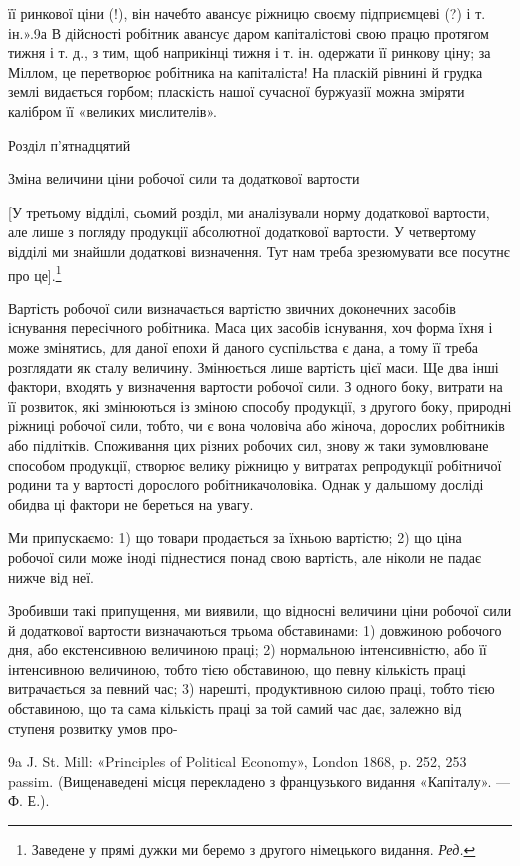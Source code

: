 її ринкової ціни (!), він начебто авансує ріжницю своєму підприємцеві
(?) і т. ін.».9а В дійсності робітник авансує даром
капіталістові свою працю протягом тижня і т. д., з тим, щоб
наприкінці тижня і т. ін. одержати її ринкову ціну; за Міллом,
це перетворює робітника на капіталіста! На пласкій рівнині
й грудка землі видається горбом; пласкість нашої сучасної буржуазії
можна зміряти калібром її «великих мислителів».

Розділ п’ятнадцятий

Зміна величини ціни робочої сили та додаткової
вартости

[У третьому відділі, сьомий розділ, ми аналізували норму
додаткової вартости, але лише з погляду продукції абсолютної
додаткової вартости. У четвертому відділі ми знайшли додаткові
визначення. Тут нам треба зрезюмувати все посутнє про це].\footnote*{
Заведене у прямі дужки ми беремо з другого німецького видання.
\emph{Ред.}
}

Вартість робочої сили визначається вартістю звичних доконечних
засобів існування пересічного робітника. Маса цих засобів
існування, хоч форма їхня і може змінятись, для даної епохи
й даного суспільства є дана, а тому її треба розглядати як сталу
величину. Змінюється лише вартість цієї маси. Ще два інші
фактори, входять у визначення вартости робочої сили. З одного
боку, витрати на її розвиток, які змінюються із зміною способу
продукції, з другого боку, природні ріжниці робочої сили, тобто,
чи є вона чоловіча або жіноча, дорослих робітників або підлітків.
Споживання цих різних робочих сил, знову ж таки зумовлюване
способом продукції, створює велику ріжницю у витратах репродукції
робітничої родини та у вартості дорослого робітникачоловіка.
Однак у дальшому досліді обидва ці фактори не береться
на увагу.

Ми припускаємо: 1) що товари продається за їхньою вартістю;
2) що ціна робочої сили може іноді піднестися понад свою вартість,
але ніколи не падає нижче від неї.

Зробивши такі припущення, ми виявили, що відносні величини
ціни робочої сили й додаткової вартости визначаються
трьома обставинами: 1) довжиною робочого дня, або екстенсивною
величиною праці; 2) нормальною інтенсивністю, або її інтенсивною
величиною, тобто тією обставиною, що певну кількість
праці витрачається за певний час; 3) нарешті, продуктивною
силою праці, тобто тією обставиною, що та сама кількість праці
за той самий час дає, залежно від ступеня розвитку умов про-

9a J. St. Mill: «Principles of Political Economy», London 1868,
p. 252, 253 passim. (Вищенаведені місця перекладено з французького
видання «Капіталу». — Ф. Е.).